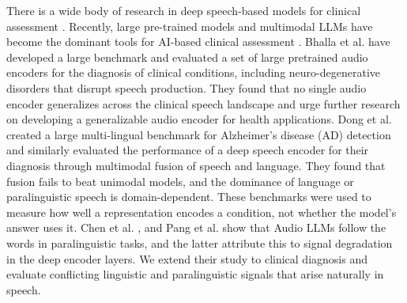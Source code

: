 \documentclass{article}
\begin{document}
There is a wide body of research in deep speech-based models for clinical assessment \cite{Cummins2015}. Recently, large pre-trained models and multimodal LLMs have become the dominant tools for AI-based clinical assessment \cite{speechdx,fend,loweimi_zero-shot_2025}. Bhalla et al. \cite{speechdx} have developed a large benchmark and evaluated a set of large pretrained audio encoders for the diagnosis of clinical conditions, including neuro-degenerative disorders that disrupt speech production. They found that no single audio encoder generalizes across the clinical speech landscape and urge further research on developing a generalizable audio encoder for health applications. Dong et al. \cite{fend} created a large multi-lingual benchmark for Alzheimer's disease (AD) detection and similarly evaluated the performance of a deep speech encoder for their diagnosis through multimodal fusion of speech and language. They found that fusion fails to beat unimodal models, and the dominance of language or paralinguistic speech is domain-dependent. These benchmarks were used to measure how well a representation encodes a condition, not whether the model's answer uses it. Chen et al. \cite{listen}, and Pang et al. \cite{voxparadox} show that Audio LLMs follow the words in paralinguistic tasks, and the latter attribute this to signal degradation in the deep encoder layers. We extend their study to clinical diagnosis and evaluate conflicting linguistic and paralinguistic signals that arise naturally in speech.
\end{document}
